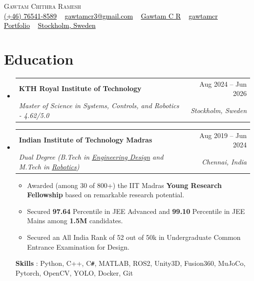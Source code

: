\documentclass[letterpaper, 11pt]{article}
\makeatletter
\newcommand{\resumeSubheading}[4]{
\vspace{-2pt}
\item
\begin{tabular*}{1.0\textwidth}[t]{l@{\extracolsep{\fill}}r}
	\textbf{#1}       & {\small #2} \\
     [-2pt]
	\textit{{\small#3}} & \textit{\small #4} \\
\end{tabular*}
\vspace{-10pt}
}
\newcommand{\resumeSubHeadingListStart}{\begin{itemize}[leftmargin=0.0in, label={}]}
\newcommand{\resumeSubHeadingListEnd}{\end{itemize}\vspace{-1em}}
\makeatother
\begin{document}
	
\begin{center}
    {\Huge \scshape Gawtam Chithra Ramesh} \\
    \vspace{3pt}
    \small 
    { %
    \href{tel:+46764518589}{{\faMobile*} \textcolor{black}{(+46) 76541-8589}} ~
    \href{mailto:gawtamcr3@gmail.com}{{\faPaperPlane} \textcolor{black}{gawtamcr3@gmail.com}} ~
    \href{https://linkedin.com/in/gawtamcr/}{{\faLinkedinIn} \textcolor{black}{Gawtam C R}} ~
    \href{https://github.com/gawtamcr}{{\faGithub} \textcolor{black}{gawtamcr}} ~
    \href{https://gawtamcr.github.io/}{{\faGlobe} \textcolor{black}{Portfolio}} ~
    \href{https://maps.google.com/?q=Stockholm,Sweden}{{\faMapMarker*} \textcolor{black}{Stockholm, Sweden}}
    }
    \vspace{-8pt}
\end{center}

\section{\color{Blue}Education}
    \resumeSubHeadingListStart 
    \resumeSubheading {KTH Royal Institute of Technology}{Aug 2024 -- Jun 2026}{Master of Science in Systems, Controls, and Robotics - 4.62/5.0}{Stockholm, Sweden}
    \resumeSubheading {Indian Institute of Technology Madras}{Aug 2019 -- Jun 2024}{Dual Degree (B.Tech in \href{https://ed.iitm.ac.in/about.html}{Engineering Design} and M.Tech in \href{https://ed.iitm.ac.in/~robotics_lab/}{Robotics})}{Chennai, India}
    \vspace{-0.3em}
    \small{
    \begin{itemize}[leftmargin=0.15in]
        \setlength{\itemsep}{-0.3em}
        \item Awarded (among 30 of 800+) the IIT Madras \textbf{Young Research Fellowship} based on remarkable research potential.
        \item Secured \textbf{97.64} Percentile in JEE Advanced and \textbf{99.10} Percentile in JEE Mains among \textbf{1.5M} candidates.
        \item Secured an All India Rank of 52 out of 50k in Undergraduate Common Entrance Examination for Design.
    \end{itemize}
    }
    \vspace{-0.7em}
    \textbf{Skills} : Python, C++, C\texttt{\#}, MATLAB, ROS2, Unity3D, Fusion360, MuJoCo, Pytorch, OpenCV, YOLO, Docker, Git
    \resumeSubHeadingListEnd
\end{document}
